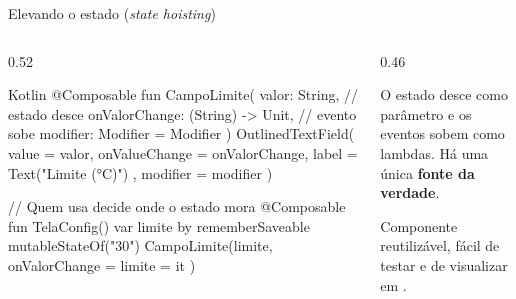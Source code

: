 \documentclass[aspectratio=169,10pt]{beamer}
\begin{document}
\begin{frame}[fragile]{Elevando o estado (\emph{state hoisting})}
  \begin{columns}[T]
    \begin{column}{0.52\textwidth}
\begin{codigo}[title=Componente sem estado (stateless)]{Kotlin}
@Composable
fun CampoLimite(
  valor: String,                   // estado desce
  onValorChange: (String) -> Unit, // evento sobe
  modifier: Modifier = Modifier
) {
  OutlinedTextField(
    value = valor,
    onValueChange = onValorChange,
    label = { Text("Limite (°C)") },
    modifier = modifier
  )
}

// Quem usa decide onde o estado mora
@Composable
fun TelaConfig() {
  var limite by rememberSaveable { mutableStateOf("30") }
  CampoLimite(limite, onValorChange = { limite = it })
}
\end{codigo}
    \end{column}
    \begin{column}{0.46\textwidth}
      \centering
      \begin{conceito}
        O estado desce como parâmetro e os eventos sobem como lambdas. Há uma única \textbf{fonte da verdade}.
      \end{conceito}
      \begin{dica}[Vantagens]
        Componente reutilizável, fácil de testar e de visualizar em .
      \end{dica}
    \end{column}
  \end{columns}
\end{frame}
\end{document}
